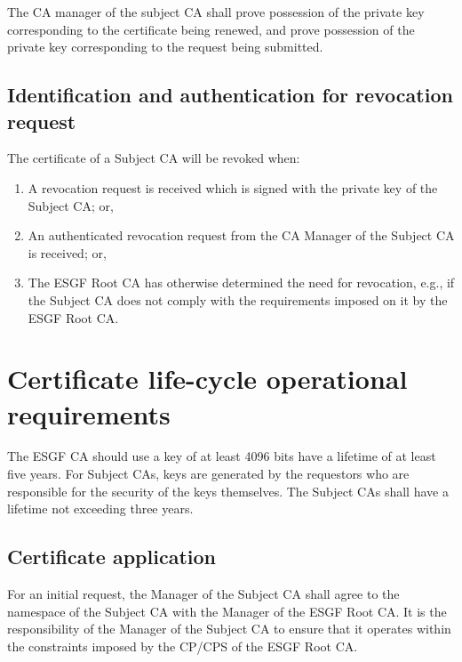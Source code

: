 The CA manager of the subject CA shall prove
possession of the private key corresponding to the certificate being
renewed, and prove possession of the private key corresponding to the
request being submitted.

\subsection{Identification and authentication for revocation request}\label{identification-and-authentication-for-revocation-request}

The certificate of a Subject CA will be revoked when:

\begin{enumerate}
\item
  
  A revocation request is received which is signed with the private key
  of the Subject CA; or,
  
\item
  
  An authenticated revocation request from the CA Manager of the Subject
  CA is received; or,
  
\item
  
  The ESGF Root CA has otherwise determined the need for revocation,
  e.g., if the Subject CA does not comply with the requirements imposed
  on it by the ESGF Root CA.
  
\end{enumerate}

\section{Certificate life-cycle operational requirements}\label{certificate-life-cycle-operational-requirements}

The ESGF CA should use a key of at least 4096 bits have a lifetime of at least five years. For Subject CAs, keys are generated by the requestors who are responsible for the security of the keys themselves. The Subject CAs shall have a lifetime not exceeding three years.

\subsection{Certificate application}\label{certificate-application}

For an initial request, the Manager of the Subject CA shall agree to the
namespace of the Subject CA with the Manager of the ESGF Root CA. It is
the responsibility of the Manager of the Subject CA to ensure that it
operates within the constraints imposed by the CP/CPS of the ESGF Root CA.

